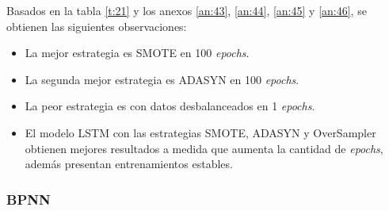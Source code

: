 Basados en la tabla \ref{t:21} y los anexos \ref{an:43}, \ref{an:44}, \ref{an:45} y \ref{an:46}, se obtienen las siguientes observaciones:
\begin{itemize}
	\item La mejor estrategia es SMOTE en 100 \textit{epochs}.
	\item La segunda mejor estrategia es ADASYN en 100 \textit{epochs}.
	\item La peor estrategia es con datos desbalanceados en 1 \textit{epochs}.
	\item El modelo LSTM con las estrategias SMOTE, ADASYN y OverSampler obtienen mejores resultados a medida que aumenta la cantidad de \textit{epochs}, adem\'{a}s presentan entrenamientos estables.
\end{itemize}

\subsubsection{BPNN}
